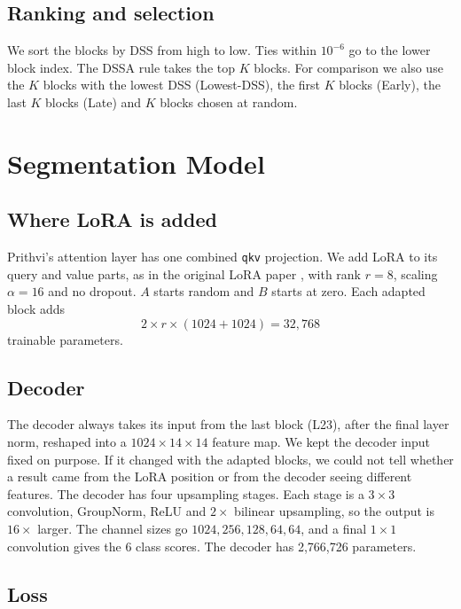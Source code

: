 \documentclass[11pt,a4paper]{report}
\begin{document}
\subsection{Ranking and selection}

We sort the blocks by DSS from high to low. Ties within $10^{-6}$ go to the lower block index. The DSSA rule takes the top $K$ blocks. For comparison we also use the $K$ blocks with the lowest DSS (Lowest-DSS), the first $K$ blocks (Early), the last $K$ blocks (Late) and $K$ blocks chosen at random.

\section{Segmentation Model}

\subsection{Where LoRA is added}

Prithvi's attention layer has one combined \texttt{qkv} projection. We add LoRA to its query and value parts, as in the original LoRA paper \cite{hu2022lora}, with rank $r = 8$, scaling $\alpha = 16$ and no dropout. $A$ starts random and $B$ starts at zero. Each adapted block adds
\begin{equation}
    2 \times r \times (1024 + 1024) = 32{,}768
\end{equation}
trainable parameters.

\subsection{Decoder}

The decoder always takes its input from the last block (L23), after the final layer norm, reshaped into a $1024 \times 14 \times 14$ feature map. We kept the decoder input fixed on purpose. If it changed with the adapted blocks, we could not tell whether a result came from the LoRA position or from the decoder seeing different features. The decoder has four upsampling stages. Each stage is a $3 \times 3$ convolution, GroupNorm, ReLU and $2\times$ bilinear upsampling, so the output is $16\times$ larger. The channel sizes go $1024, 256, 128, 64, 64$, and a final $1 \times 1$ convolution gives the 6 class scores. The decoder has 2,766,726 parameters.

\subsection{Loss}
\end{document}
